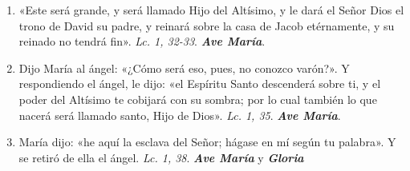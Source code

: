 \documentclass[../../devocionario.tex]{subfiles}
\begin{document}
\begin{enumerate}
        \item «Este será grande, y será llamado Hijo del Altísimo, y le dará el Señor Dios el trono de David su padre, 
                y reinará sobre la casa de Jacob etérnamente, y su reinado no tendrá fin».  \emph{Lc. 1, 32-33}. \textbf{\emph{Ave María}}.

        \item Dijo María al ángel: «¿Cómo será eso, pues, no conozco varón?». Y respondiendo el ángel, le dijo: «el Espíritu Santo descenderá sobre ti, 
                y el poder del Altísimo te cobijará con su sombra; por lo cual también lo que nacerá será llamado santo, Hijo de Dios». 
                \emph{Lc. 1, 35}. \textbf{\emph{Ave María}}.

        \item María dijo: «he aquí la esclava del Señor; hágase en mí según tu palabra». Y se retiró de ella el ángel. \emph{Lc. 1, 38}. 
                \textbf{\emph{Ave María}} y \textbf{\emph{Gloria}}

    \end{enumerate}
\end{document}
